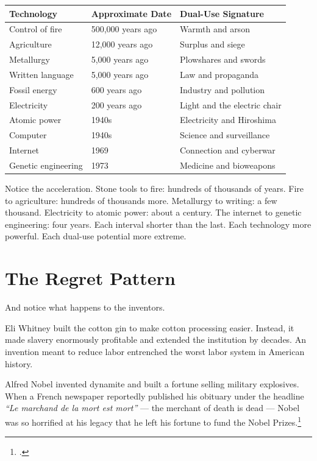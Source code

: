 \noindent\begin{tabular}{p{3.8cm}p{4.2cm}p{6cm}}
\textbf{Technology} & \textbf{Approximate Date} & \textbf{Dual-Use Signature} \\
\hline
Control of fire & 500,000 years ago & Warmth and arson \\
Agriculture & 12,000 years ago & Surplus and siege \\
Metallurgy & 5,000 years ago & Plowshares and swords \\
Written language & 5,000 years ago & Law and propaganda \\
Fossil energy & 600 years ago & Industry and pollution \\
Electricity & 200 years ago & Light and the electric chair \\
Atomic power & 1940s & Electricity and Hiroshima \\
Computer & 1940s & Science and surveillance \\
Internet & 1969 & Connection and cyberwar \\
Genetic engineering & 1973 & Medicine and bioweapons \\
\end{tabular}

\vspace{0.5cm}

Notice the acceleration. Stone tools to fire: hundreds of thousands of years. Fire to agriculture: hundreds of thousands more. Metallurgy to writing: a few thousand. Electricity to atomic power: about a century. The internet to genetic engineering: four years. Each interval shorter than the last. Each technology more powerful. Each dual-use potential more extreme.

\section*{The Regret Pattern}
\label{pos08:the-regret-pattern}

And notice what happens to the inventors.

Eli Whitney built the cotton gin to make cotton processing easier. Instead, it made slavery enormously profitable and extended the institution by decades. An invention meant to reduce labor entrenched the worst labor system in American history.

Alfred Nobel invented dynamite and built a fortune selling military explosives. When a French newspaper reportedly published his obituary under the headline \textit{``Le marchand de la mort est mort''} --- the merchant of death is dead --- Nobel was so horrified at his legacy that he left his fortune to fund the Nobel Prizes.\footcite{fant1993}

